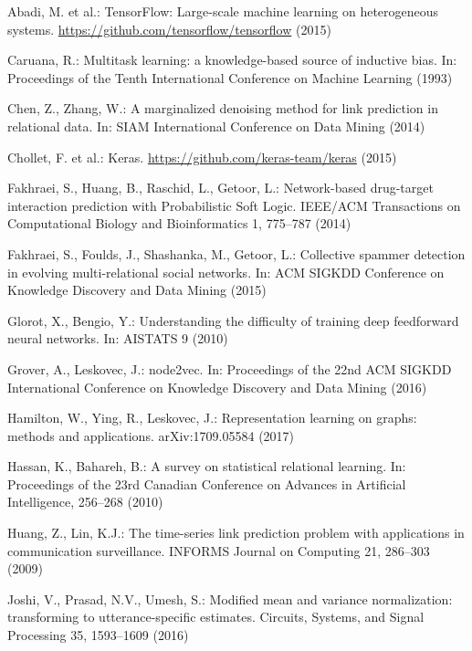 \documentclass[letterpaper, conference]{IEEEtran}
\begin{document}
\begin{thebibliography}{99}
Abadi, M. et al.:
TensorFlow: Large-scale machine learning on heterogeneous systems.
\url{https://github.com/tensorflow/tensorflow} (2015)

Caruana, R.:
Multitask learning: a knowledge-based source of inductive bias.
In: Proceedings of the Tenth International Conference on Machine Learning (1993)

Chen, Z., Zhang, W.:
A marginalized denoising method for link prediction in relational data.
In: SIAM International Conference on Data Mining (2014)

Chollet, F. et al.:
Keras.
\url{https://github.com/keras-team/keras} (2015)

Fakhraei, S., Huang, B., Raschid, L., Getoor, L.:
Network-based drug-target interaction prediction with Probabilistic Soft Logic.
IEEE/ACM Transactions on Computational Biology and Bioinformatics 1, 775--787 (2014)

Fakhraei, S., Foulds, J., Shashanka, M., Getoor, L.:
Collective spammer detection in evolving multi-relational social networks.
In: ACM SIGKDD Conference on Knowledge Discovery and Data Mining (2015)

Glorot, X., Bengio, Y.:
Understanding the difficulty of training deep feedforward neural networks.
In: AISTATS 9 (2010)

Grover, A., Leskovec, J.:
node2vec.
In: Proceedings of the 22nd ACM SIGKDD International Conference on Knowledge Discovery and Data Mining (2016)

Hamilton, W., Ying, R., Leskovec, J.:
Representation learning on graphs: methods and applications.
arXiv:1709.05584 (2017)

Hassan, K., Bahareh, B.:
A survey on statistical relational learning.
In: Proceedings of the 23rd Canadian Conference on Advances in Artificial Intelligence, 256--268 (2010)

Huang, Z., Lin, K.J.:
The time-series link prediction problem with applications in communication surveillance.
INFORMS Journal on Computing 21, 286--303 (2009)

Joshi, V., Prasad, N.V., Umesh, S.:
Modified mean and variance normalization: transforming to utterance-specific estimates.
Circuits, Systems, and Signal Processing 35, 1593--1609 (2016)


\end{thebibliography}
\end{document}
